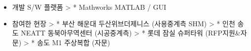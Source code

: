 \documentclass[]{article}
\begin{document}
\begin{itemize}
{  Identification}\footnote{The field of
    \href{https://en.wikipedia.org/wiki/System_identification}{system
    identification} uses statistical methods to build mathematical
    models of dynamical systems from measured data. System
    identification also includes the optimal design of experiments for
    efficiently generating informative data for fitting such models as
    well as model reduction.}
\item
  개발 S/W 플랫폼 \textgreater{} * Mathworks MATLAB / GUI
\item
  참여한 현장 \textgreater{} * 부산 해운대 두산위브더제니스 (사용중계측
  SHM) \textgreater{} * 인천 송도 NEATT 동북아무역센터 (시공중계측)
  \textgreater{} * 롯데 잠실 슈퍼타워 (RFP지원\&자문) \textgreater{} * 송도 M1
  주상복합 (자문)
\end{itemize}
\end{document}
